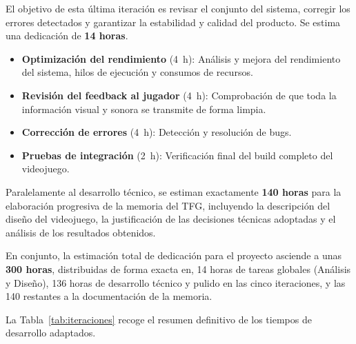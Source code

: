 El objetivo de esta última iteración es revisar el conjunto del sistema, corregir los errores detectados y garantizar la estabilidad y calidad del producto. Se estima una dedicación de \textbf{14 horas}.

\begin{itemize}
	\item \textbf{Optimización del rendimiento} (4~h): Análisis y mejora del rendimiento del sistema, hilos de ejecución y consumos de recursos.
	\item \textbf{Revisión del feedback al jugador} (4~h): Comprobación de que toda la información visual y sonora se transmite de forma limpia.
	\item \textbf{Corrección de errores} (4~h): Detección y resolución de bugs.
	\item \textbf{Pruebas de integración} (2~h): Verificación final del build completo del videojuego.
\end{itemize}

Paralelamente al desarrollo técnico, se estiman exactamente \textbf{140 horas} para la elaboración progresiva de la memoria del TFG, incluyendo la descripción del diseño del videojuego, la justificación de las decisiones técnicas adoptadas y el análisis de los resultados obtenidos.

En conjunto, la estimación total de dedicación para el proyecto asciende a unas \textbf{300 horas}, distribuidas de forma exacta en, 14 horas de tareas globales (Análisis y Diseño), 136 horas de desarrollo técnico y pulido en las cinco iteraciones, y las 140 restantes a la documentación de la memoria.

La Tabla~\ref{tab:iteraciones} recoge el resumen definitivo de los tiempos de desarrollo adaptados.


